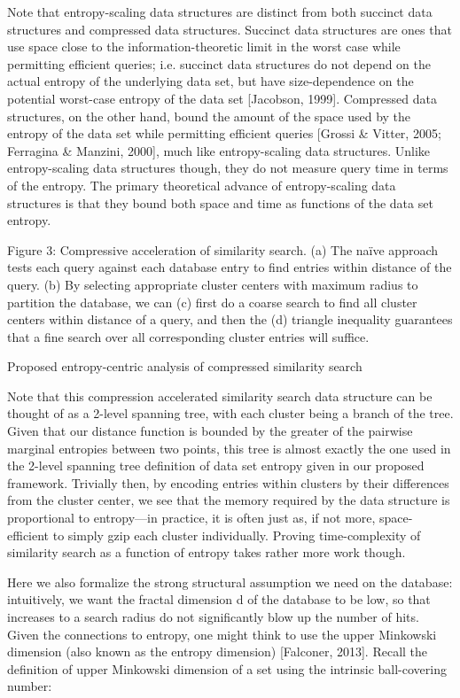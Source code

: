 \documentclass{amsbook}
\theoremstyle{definition}
\theoremstyle{remark}
\numberwithin{equation}{section}
\begin{document}
Note that entropy-scaling data structures are distinct from both succinct data structures and compressed data structures.
Succinct data structures are ones that use space close to the information-theoretic limit in the worst case while permitting efficient queries; i.e.
succinct data structures do not depend on the actual entropy of the underlying data set, but have size-dependence on the potential worst-case entropy of the data set [Jacobson, 1999].
Compressed data structures, on the other hand, bound the amount of the space used by the entropy of the data set while permitting efficient queries [Grossi \& Vitter, 2005; Ferragina \& Manzini, 2000], much like entropy-scaling data structures.
Unlike entropy-scaling data structures though, they do not measure query time in terms of the entropy.
The primary theoretical advance of entropy-scaling data structures is that they bound both space and time as functions of the data set entropy.


Figure 3: Compressive acceleration of similarity search.
(a) The naïve approach tests each query against each database entry to find entries within distance  of the query.
(b) By selecting appropriate cluster centers with maximum radius  to partition the database, we can (c) first do a coarse search to find all cluster centers within distance  of a query, and then the (d) triangle inequality guarantees that a fine search over all corresponding cluster entries will suffice.

Proposed entropy-centric analysis of compressed similarity search

Note that this compression accelerated similarity search data structure can be thought of as a 2-level spanning tree, with each cluster being a branch of the tree.
Given that our distance function is bounded by the greater of the pairwise marginal entropies between two points, this tree is almost exactly the one used in the 2-level spanning tree definition of data set entropy given in our proposed framework.
Trivially then, by encoding entries within clusters by their differences from the cluster center, we see that the memory required by the data structure is proportional to entropy—in practice, it is often just as, if not more, space-efficient to simply gzip each cluster individually.
Proving time-complexity of similarity search as a function of entropy takes rather more work though.

Here we also formalize the strong structural assumption we need on the database: intuitively, we want the fractal dimension d of the database to be low, so that increases to a search radius do not significantly blow up the number of hits.
Given the connections to entropy, one might think to use the upper Minkowski dimension (also known as the entropy dimension) [Falconer, 2013].
Recall the definition of upper Minkowski dimension of a set  using the intrinsic ball-covering number:
\end{document}
